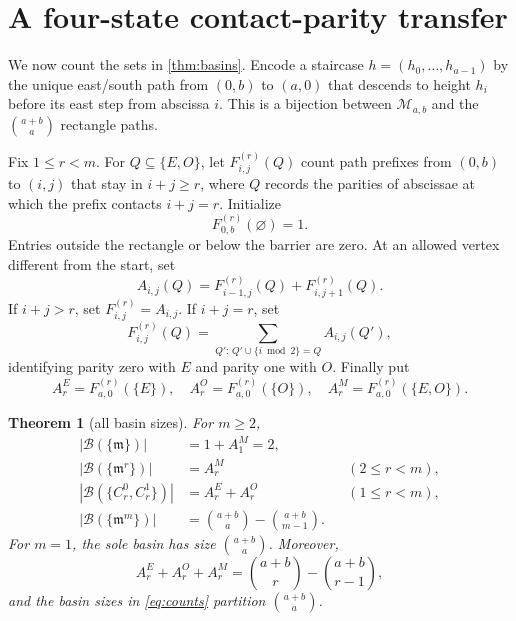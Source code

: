 \documentclass[10pt,a4paper]{amsart}
\newtheorem{theorem}{Theorem}[section]
\theoremstyle{definition}
\theoremstyle{remark}
\newcommand{\Basin}{\mathcal B}
\newcommand{\mm}{\mathfrak m}
\newcommand{\Mcal}{\mathcal M}
\begin{document}
\section{A four-state contact-parity transfer}

We now count the sets in \cref{thm:basins}.  Encode a staircase
\(h=(h_0,\ldots,h_{a-1})\) by the unique east/south path from \((0,b)\) to
\((a,0)\) that descends to height \(h_i\) before its east step from
abscissa \(i\).  This is a bijection between \(\Mcal_{a,b}\) and the
\(\binom{a+b}{a}\) rectangle paths.

Fix \(1\leq r<m\).  For \(Q\subseteq\{E,O\}\), let
\(F^{(r)}_{i,j}(Q)\) count path prefixes from \((0,b)\) to \((i,j)\) that
stay in \(i+j\geq r\), where \(Q\) records the parities of abscissae at
which the prefix contacts \(i+j=r\).  Initialize
\[
                       F^{(r)}_{0,b}(\varnothing)=1.       \tag{5.1}
\]
Entries outside the rectangle or below the barrier are zero.  At an allowed
vertex different from the start, set
\[
A_{i,j}(Q)=F^{(r)}_{i-1,j}(Q)+F^{(r)}_{i,j+1}(Q).          \tag{5.2}
\]
If \(i+j>r\), set \(F^{(r)}_{i,j}=A_{i,j}\).  If \(i+j=r\), set
\[
F^{(r)}_{i,j}(Q)=
\sum_{Q':\,Q'\cup\{i\bmod2\}=Q}A_{i,j}(Q'),               \tag{5.3}\label{eq:transfer}
\]
identifying parity zero with \(E\) and parity one with \(O\).  Finally put
\[
A_r^E=F^{(r)}_{a,0}(\{E\}),\quad
A_r^O=F^{(r)}_{a,0}(\{O\}),\quad
A_r^M=F^{(r)}_{a,0}(\{E,O\}).                             \tag{5.4}
\]

\begin{theorem}[all basin sizes]\label{thm:counts}
For \(m\geq2\),
\[
\begin{aligned}
|\Basin(\{\mm\})|&=1+A_1^M=2,\\
|\Basin(\{\mm^r\})|&=A_r^M &&(2\leq r<m),\\
|\Basin(\{C_r^0,C_r^1\})|&=A_r^E+A_r^O &&(1\leq r<m),\\
|\Basin(\{\mm^m\})|
 &=\binom{a+b}{a}-\binom{a+b}{m-1}.
\end{aligned}                                             \tag{5.5}\label{eq:counts}
\]
For \(m=1\), the sole basin has size \(\binom{a+b}{a}\).  Moreover,
\[
A_r^E+A_r^O+A_r^M
=\binom{a+b}{r}-\binom{a+b}{r-1},                         \tag{5.6}\label{eq:layer}
\]
and the basin sizes in \eqref{eq:counts} partition \(\binom{a+b}{a}\).
\end{theorem}
\end{document}
